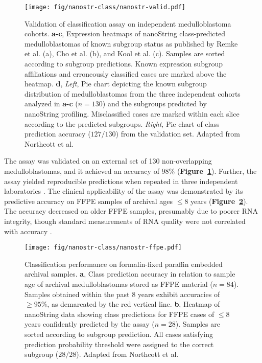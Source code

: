 \documentclass[11pt,letterpaper]{article}
\theoremstyle{definition}
\newcommand{\emphlab}[1]{\textbf{\textsf{#1}}}
\newcommand{\citefig}[1]{\emphlab{Figure~\ref{fig:#1}}}
\begin{document}
\begin{figure}[hb]
	\begin{center}
		\texttt{[image: fig/nanostr-class/nanostr-valid.pdf]}
	\end{center}
	\caption[Validation of classification assay on independent medulloblastoma cohorts]
	{
	Validation of classification assay on independent medulloblastoma cohorts.
	\textbf{a-c}, Expression heatmaps of nanoString class-predicted medulloblastomas of known subgroup status as published by Remke et al. (a), Cho et al. (b), and Kool et al. (c). Samples are sorted according to subgroup predictions. Known expression subgroup affiliations and erroneously classified cases are marked above the heatmap.
	\textbf{d}, \emph{Left}, Pie chart depicting the known subgroup distribution of medulloblastomas from the three independent cohorts analyzed in \textbf{a-c} ($n = 130$) and the subgroups predicted by nanoString profiling. Misclassified cases are marked within each slice according to the predicted subgroups. \emph{Right}, Pie chart of class prediction accuracy ($127/130$) from the validation set. Adapted from Northcott et al.
	}
	\label{fig:nanostr-valid}
\end{figure}

The assay was validated on an external set of 130 non-overlapping medulloblastomas, and it achieved an accuracy of 98\% (\citefig{nanostr-valid}). Further, the assay yielded reproducible predictions when repeated in three independent laboratories . The clinical applicability of the assay was demonstrated by its predictive accuracy on FFPE samples of archival ages $\leq 8$ years (\citefig{nanostr-ffpe}). The accuracy decreased on older FFPE samples, presumably due to poorer RNA integrity, though standard measurements of RNA quality were not correlated with accuracy .

\begin{figure}[ht]
	\begin{center}
		\texttt{[image: fig/nanostr-class/nanostr-ffpe.pdf]}
	\end{center}
	\caption[Classification performance on formalin-fixed paraffin embedded archival samples]
	{
	Classification performance on formalin-fixed paraffin embedded archival samples.
	\textbf{a}, Class prediction accuracy in relation to sample age of archival medulloblastomas stored as FFPE material ($n = 84$). Samples obtained within the past 8 years exhibit accuracies of $\geq 95\%$, as demarcated by the red vertical line.
	\textbf{b}, Heatmap of nanoString data showing class predictions for FFPE cases of $\leq 8$ years confidently predicted by the assay ($n = 28$). Samples are sorted according to subgroup prediction. All cases satisfying prediction probability threshold were assigned to the correct subgroup ($28/28$). Adapted from Northcott et al.
	}
	\label{fig:nanostr-ffpe}
\end{figure}
\end{document}

